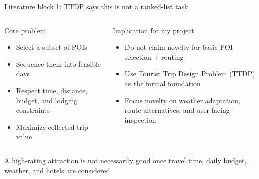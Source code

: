 \documentclass[aspectratio=169,10pt]{beamer}
\newcommand{\smallcite}[1]{\vspace{0.15em}{\footnotesize\textcolor{DarkGray}{#1}}}
\begin{document}
\begin{frame}{Literature block 1: TTDP says this is not a ranked-list task}
\begin{columns}[T,onlytextwidth]
\begin{block}{Core problem}
\begin{itemize}
  \item Select a subset of POIs
  \item Sequence them into feasible days
  \item Respect time, distance, budget, and lodging constraints
  \item Maximize collected trip value
\end{itemize}
\smallcite{Vansteenwegen et al. 2011; Gunawan et al. 2016; Ruiz-Meza and Montoya-Torres 2022}
\end{block}

\begin{block}{Implication for my project}
\begin{itemize}
  \item Do not claim novelty for basic POI selection + routing
  \item Use Tourist Trip Design Problem (TTDP) as the formal foundation
  \item Focus novelty on weather adaptation, route alternatives, and user-facing inspection
\end{itemize}
\end{block}
\end{columns}

\vspace{0.5em}
\centering
\colorbox{LightRed}{\parbox{0.86\textwidth}{\centering\small A high-rating attraction is not necessarily good once travel time, daily budget, weather, and hotels are considered.}}
\end{frame}
\end{document}
